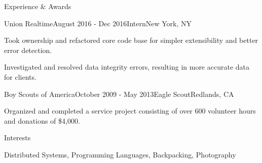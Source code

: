 \documentclass{resume} %
\begin{document}
\begin{rSection}{Experience \& Awards}

\begin{rSubsection}{Union Realtime}{August 2016 - Dec 2016}{Intern}{New York, NY}
\item Took ownership and refactored core code base for simpler extensibility and better error detection.
\item Investigated and resolved data integrity errors, resulting in more accurate data for clients.
\end{rSubsection}




\begin{rSubsection}{Boy Scouts of America}{October 2009 - May 2013}{Eagle Scout}{Redlands, CA}
\item Organized and completed a service project consisting of over 600 volunteer hours and donations of \$4,000.
\end{rSubsection}

\end{rSection}


\begin{rSection}{Interests}

Distributed Systems, Programming Languages, Backpacking, Photography

\end{rSection}





\end{document}
